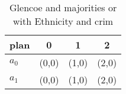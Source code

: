 \documentclass[a4paper]{article}
\begin{document}
\begin{table}
\begin{adjustbox}{width=0.6\columnwidth}
\begin{tabular}{|l|l|l|l|}
\hline
\textbf{plan} & \multicolumn{1}{c|}{\textbf{0}} & \multicolumn{1}{c|}{\textbf{1}} & \multicolumn{1}{c|}{\textbf{2}} \\ \hline
\textbf{$a_0$}  & (0,0) & (1,0) & (2,0) \\ \hline
\textbf{$a_1$}  & (0,0) & (1,0) & (2,0) \\ \hline
\end{tabular}
\end{adjustbox}
\caption{Glencoe and majorities or with Ethnicity and crim
}
\end{table}
\end{document}
